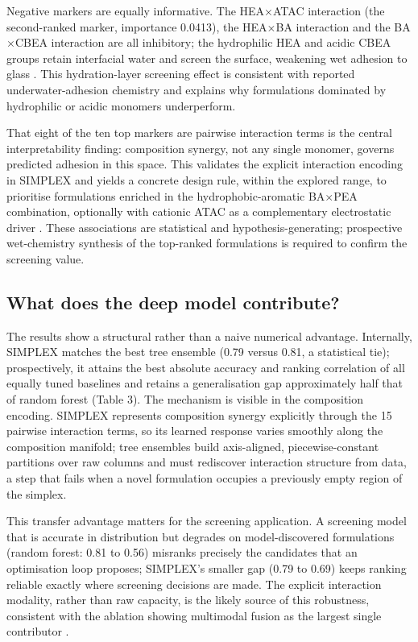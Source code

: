 Negative markers are equally informative. The HEA$\times$ATAC interaction (the second-ranked marker, importance 0.0413), the HEA$\times$BA interaction and the BA$\times$CBEA interaction are all inhibitory; the hydrophilic HEA and acidic CBEA groups retain interfacial water and screen the surface, weakening wet adhesion to glass \cite{zhang2022hydrationextent,valle2005hydrationforces,hommer2009polycarboxylate,narayanan2021underwater}. This hydration-layer screening effect is consistent with reported underwater-adhesion chemistry and explains why formulations dominated by hydrophilic or acidic monomers underperform.

That eight of the ten top markers are pairwise interaction terms is the central interpretability finding: composition synergy, not any single monomer, governs predicted adhesion in this space. This validates the explicit interaction encoding in SIMPLEX and yields a concrete design rule, within the explored range, to prioritise formulations enriched in the hydrophobic-aromatic BA$\times$PEA combination, optionally with cationic ATAC as a complementary electrostatic driver \cite{cai2021bioadhesives,fan2019cationicaromatic}. These associations are statistical and hypothesis-generating; prospective wet-chemistry synthesis of the top-ranked formulations is required to confirm the screening value.

\subsection{What does the deep model contribute?}

The results show a structural rather than a naive numerical advantage. Internally, SIMPLEX matches the best tree ensemble (0.79 versus 0.81, a statistical tie); prospectively, it attains the best absolute accuracy and ranking correlation of all equally tuned baselines and retains a generalisation gap approximately half that of random forest (Table 3). The mechanism is visible in the composition encoding. SIMPLEX represents composition synergy explicitly through the 15 pairwise interaction terms, so its learned response varies smoothly along the composition manifold; tree ensembles build axis-aligned, piecewise-constant partitions over raw columns and must rediscover interaction structure from data, a step that fails when a novel formulation occupies a previously empty region of the simplex.

This transfer advantage matters for the screening application. A screening model that is accurate in distribution but degrades on model-discovered formulations (random forest: 0.81 to 0.56) misranks precisely the candidates that an optimisation loop proposes; SIMPLEX's smaller gap (0.79 to 0.69) keeps ranking reliable exactly where screening decisions are made. The explicit interaction modality, rather than raw capacity, is the likely source of this robustness, consistent with the ablation showing multimodal fusion as the largest single contributor \cite{kim2023smallML,agrawal2016mlmaterials,isayev2017mlmaterials,ward2018mlcomposite}.

